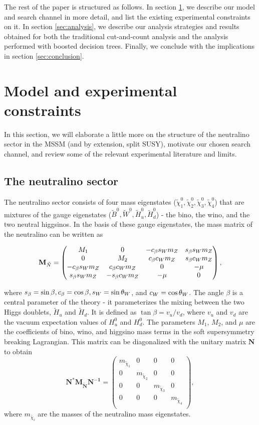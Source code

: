 The rest of the paper is structured as follows. In section \ref{sec:model}, we describe our model and search channel in more detail, and list the existing experimental constraints on it. In section \ref{sec:analysis}, we describe our analysis strategies and results obtained for both the traditional cut-and-count analysis and the analysis performed with boosted decision trees. Finally, we conclude with the implications in section \ref{sec:conclusion}.

\section{Model and experimental constraints}\label{sec:model}

In this section, we will elaborate a little more on the structure of the neutralino sector in the MSSM (and by extension, split SUSY), motivate our chosen search channel, and review some of the relevant experimental literature and limits.

\subsection{The neutralino sector}
The neutralino sector consists of four mass eigenstates ($\tilde{\chi}_1^0,\tilde{\chi}_2^0,\tilde{\chi}_3^0,\tilde{\chi}_4^0$)  that are mixtures of the gauge eigenstates ($\tilde{B}^0,\tilde{W}^0,\tilde{H}_u^0,\tilde{H}^0_d$) - the bino, the wino, and the two neutral higgsinos. In the basis of these gauge eigenstates, the mass matrix of the neutralino can be written as

\[\mathbf{M}_{\tilde{N}}=
\begin{pmatrix}
  M_1 & 0 & -c_\beta s_Wm_Z & s_\beta s_Wm_Z \\
  0 & M_2 & c_\beta c_Wm_Z & s_\beta c_Wm_Z \\
  -c_\beta s_Wm_Z & c_\beta c_Wm_Z & 0 & -\mu \\
  s_\beta s_Wm_Z & -s_\beta c_Wm_Z & -\mu & 0
\end{pmatrix},\]

\noindent where $s_\beta = \sin\beta, c_\beta = \cos\beta, s_W = \sin\theta_{W}$,  and  $c_W = \cos\theta_W$. The angle $\beta$ is a central parameter of the theory - it parameterizes the mixing between the two Higgs doublets, $\tilde{H}_u$ and $\tilde{H}_d$. It is defined as $\tan\beta = v_u/v_d$, where $v_u$ and $v_d$ are the vacuum expectation values of $H_u^0$ and $H_d^0$. The parameters $M_1$, $M_2$, and $\mu$ are the coefficients of bino, wino, and higgsino mass terms in the soft supersymmetry breaking Lagrangian.
This matrix can be diagonalized with the unitary matrix $\mathbf{N}$ to obtain 
\[\mathbf{N^*M_{\tilde{N}}N^{-1}} =
\begin{pmatrix}
  m_{\tilde{\chi}_1} & 0 & 0 & 0\\
  0 & m_{\tilde{\chi}_2} & 0 & 0 \\
  0 & 0 & m_{\tilde{\chi}_3} & 0 \\
  0 & 0 & 0 &  m_{\tilde{\chi}_4} \\
\end{pmatrix},
\]
where $m_{\tilde{\chi_i}}$ are the masses of the neutralino mass eigenstates. 

